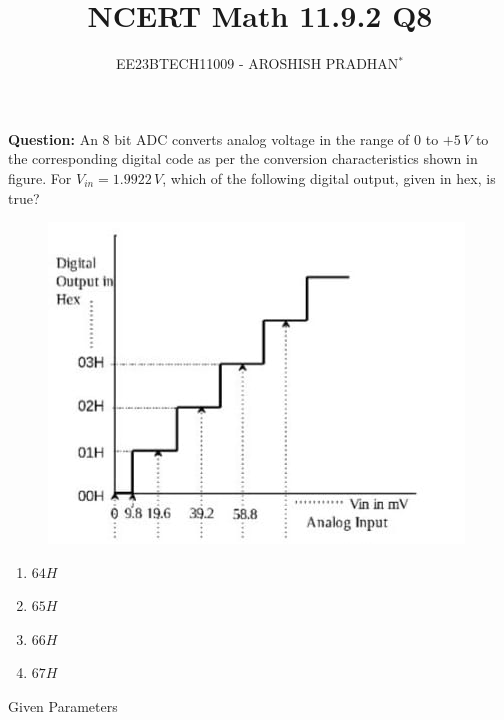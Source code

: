\documentclass[journal,12pt,twocolumn]{IEEEtran}
\theoremstyle{remark}
\begin{document}

\vspace{3cm}

\title{NCERT Math 11.9.2 Q8}
\author{EE23BTECH11009 - AROSHISH PRADHAN$^{*}$%
}
\maketitle
\newpage
\bigskip
\textbf{Question:} An $8$ bit ADC converts analog voltage in the range of $0$ to $+5\, V$ to the corresponding digital code as per the conversion characteristics shown in figure. For $V_{in} = 1.9922\, V$, which of the following digital output, given in hex, is true?

\begin{figure}[!h]
    \centering
    \includegraphics[width=\columnwidth]{2023/EE/40/figs/fig1.jpeg}
    \caption{}
    \label{fig:ADC_gate.ee.23.40}
\end{figure}
\begin{enumerate}[label=(\alph*)]
    \item $64H$
    \item $65H$
    \item $66H$
    \item $67H$
\end{enumerate}

\solution
\fi
\begin{table}[!h]
    \centering
    \resizebox{\columnwidth}{!}{}
    \caption{Given Parameters}
    \label{tab:1_gate.ee.23.40}
\end{table}
\end{document}
